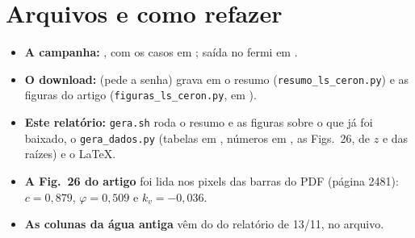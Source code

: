 \documentclass[11pt,a4paper]{article}
\begin{document}
\appendix
\section{Arquivos e como refazer}
\begin{itemize}
  \item \textbf{A campanha:} , com os casos em
    ; saída no fermi em .
  \item \textbf{O download:}  (pede a senha) grava em
     o resumo (\texttt{resumo\_ls\_ceron.py}) e as figuras do artigo
    (\texttt{figuras\_ls\_ceron.py}, em ).
  \item \textbf{Este relatório:} \texttt{gera.sh} roda o resumo e as figuras sobre o que já foi baixado, o
    \texttt{gera\_dados.py} (tabelas em , números em , as Figs.~26, de $z$ e das raízes)
    e o \LaTeX.
  \item \textbf{A Fig.~26 do artigo} foi lida nos pixels das barras do PDF (página 2481): $c = 0{,}879$,
    $\varphi = 0{,}509$ e $k_v = -0{,}036$.
  \item \textbf{As colunas da água antiga} vêm do  do relatório de 13/11, no arquivo.
\end{itemize}
\end{document}
